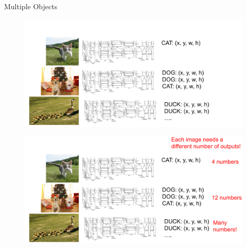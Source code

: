 \documentclass[10pt]{beamer}
\theoremstyle{remark}
\theoremstyle{definition}
\begin{document}
\begin{frame}[allowframebreaks]{Multiple Objects}

\begin{figure}
\centering
\includegraphics[width=1.0\textwidth,height=1.0\textheight,keepaspectratio]{./images/object_8.png}
\end{figure}

\framebreak

\begin{figure}
\centering
\includegraphics[width=1.0\textwidth,height=1.0\textheight,keepaspectratio]{./images/object_9.png}
\end{figure}

\end{frame}
\end{document}
